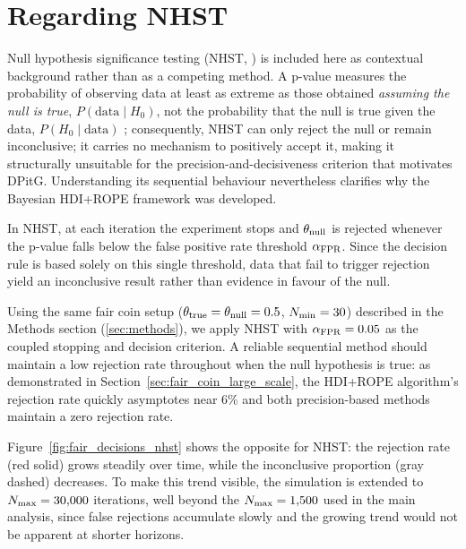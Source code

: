 \section{Regarding NHST}\label{app:nhst}
Null hypothesis significance testing (NHST, \citealt{fisher1925, neymanpearson1933})
is included here as contextual background rather than as a competing method.
A p-value measures the probability of observing data at least as extreme as those
obtained \emph{assuming the null is true}, $P(\mathrm{data}\mid H_0)$, not the
probability that the null is true given the data, $P(H_0\mid\mathrm{data})$
\citep{cohen1994, wasserstein2016};
consequently, NHST can only reject the null or remain inconclusive; it carries
no mechanism to positively accept it, making it structurally unsuitable for the
precision-and-decisiveness criterion that motivates DPitG.
Understanding its sequential behaviour nevertheless clarifies why the Bayesian
HDI+ROPE framework was developed.

In NHST, at each iteration the experiment stops and $\theta_{\rm null}$ is rejected
whenever the p-value falls below the false positive rate threshold $\alpha_{\rm FPR}$.
Since the decision rule is based solely on this single threshold, data that fail to
trigger rejection yield an inconclusive result rather than evidence in favour of the null.

Using the same fair coin setup ($\theta_{\rm true}=\theta_{\rm null}=0.5$, $N_{\rm min}=30$) described
in the Methods section (\ref{sec:methods}), we apply NHST with $\alpha_{\rm FPR}=0.05$
as the coupled stopping and decision criterion. A reliable sequential method should maintain a
low rejection rate throughout when the null hypothesis is true: as demonstrated in
Section~\ref{sec:fair_coin_large_scale}, the HDI+ROPE algorithm's rejection rate quickly asymptotes near 6\% and
both precision-based methods maintain a zero rejection rate.

Figure~\ref{fig:fair_decisions_nhst} shows the opposite for NHST: the rejection rate
(red solid) grows steadily over time, while the inconclusive proportion (gray dashed)
decreases. To make this trend visible, the simulation is extended to
$N_{\rm max}=30{,}000$ iterations, well beyond the $N_{\rm max}=1{,}500$ used in
the main analysis, since false rejections accumulate slowly and the growing trend
would not be apparent at shorter horizons.

